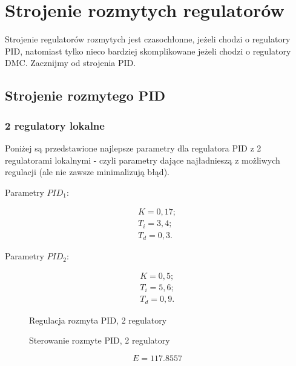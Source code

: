 \chapter{Strojenie rozmytych regulatorów}

Strojenie regulatorów rozmytych jest czasochłonne, jeżeli chodzi o regulatory PID, natomiast tylko nieco bardziej skomplikowane jeżeli chodzi o regulatory DMC. Zacznijmy od strojenia PID.

\section{Strojenie rozmytego PID}

\subsection{2 regulatory lokalne}

Poniżej są przedstawione najlepsze parametry dla regulatora PID z 2 regulatorami lokalnymi - czyli parametry dające najładnieszą z możliwych regulacji (ale nie zawsze minimalizują błąd).

Parametry $PID_1$:

\begin{equation}
\begin{matrix}
    	K = 0,17;\\
    	T_i = 3,4;\\
    	T_d = 0,3.
\end{matrix}
\end{equation}

Parametry $PID_2$:

\begin{equation}
\begin{matrix}
    	K = 0,5;\\
    	T_i = 5,6;\\
    	T_d = 0,9.
\end{matrix}
\end{equation}

\begin{figure}[H]
\centering

\caption{Regulacja rozmyta PID, 2 regulatory}
\end{figure}

\begin{figure}[H]
\centering

\caption{Sterowanie rozmyte PID, 2 regulatory}
\end{figure}

\begin{equation}
    E = \num{117,8557}
\end{equation}

